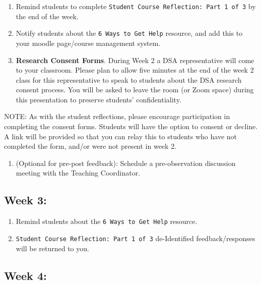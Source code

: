 \documentclass[
]{book}
\providecommand{\tightlist}{%
  \setlength{\itemsep}{0pt}\setlength{\parskip}{0pt}}
\begin{document}
\begin{enumerate}
\def\labelenumi{\arabic{enumi})}
\item
  Remind students to complete \texttt{Student\ Course\ Reflection:\ Part\ 1\ of\ 3} by the end of the week.
\item
  Notify students about the \texttt{6\ Ways\ to\ Get\ Help} resource, and add this to your moodle page/course management system.
\item
  \textbf{Research Consent Forms}. During Week 2 a DSA representative will come to your classroom. Please plan to allow five minutes at the end of the week 2 class for this representative to speak to students about the DSA research consent process. You will be asked to leave the room (or Zoom space) during this presentation to preserve students' confidentiality.
\end{enumerate}

NOTE: As with the student reflections, please encourage participation in completing the consent forms. Students will have the option to consent or decline. A link will be provided so that you can relay this to students who have not completed the form, and/or were not present in week 2.

\begin{enumerate}
\def\labelenumi{\arabic{enumi})}
\setcounter{enumi}{3}
\tightlist
\item
  (Optional for pre-post feedback): Schedule a pre-observation discussion meeting with the Teaching Coordinator.
\end{enumerate}

\hypertarget{week-3}{%
\subsection{Week 3:}\label{week-3}}

\begin{enumerate}
\def\labelenumi{\arabic{enumi})}
\item
  Remind students about the \texttt{6\ Ways\ to\ Get\ Help} resource.
\item
  \texttt{Student\ Course\ Reflection:\ Part\ 1\ of\ 3} de-Identified feedback/responses will be returned to you.
\end{enumerate}

\hypertarget{week-4}{%
\subsection{Week 4:}\label{week-4}}
\end{document}
